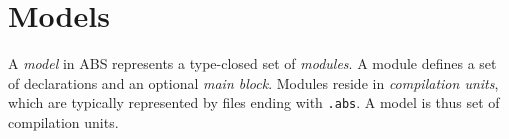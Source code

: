 \chapter{Models}
\label{sec:model}
A \emph{model} in ABS represents a type-closed set of \emph{modules}.
A module defines a set of declarations and an optional \emph{main block}.
Modules reside in \emph{compilation units}, which are typically represented by files ending with \texttt{.abs}.
A model is thus set of compilation units.

\begin{abssyntax}
            {}\\
  {} 
\end{abssyntax}

